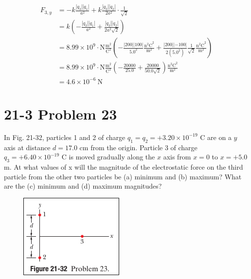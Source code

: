 \documentclass{article}
\begin{document}
\begin{align*}
    F_{3, y} &= -k \frac{|q_3||q_1|}{a^2} + k \frac{|q_3||q_2|}{2a^2} \cdot \frac{1}{\sqrt{2}} \\
    &= k \left( -\frac{|q_3||q_1|}{a^2} + \frac{|q_3||q_2|}{2a^2\sqrt{2}} \right) \\
    &= 8.99 \times 10^9 \cdot \text{N} \frac{\text{m}^2}{\text{C}^2} \left( -\frac{|200||100|}{5.0^2} \frac{\text{n$^2$C}^2}{\text{m}^2} + \frac{|200||-100|}{2(5.0^2)} \frac{1}{\sqrt{2}} \frac{\text{n$^2$C}^2}{\text{m}^2} \right) \\
    &= 8.99 \times 10^9 \cdot \text{N} \frac{\text{m}^2}{\text{C}^2} \left( -\frac{20000}{25.0} + \frac{20000}{50.0 \sqrt{2}}  \right) \frac{\text{n$^2$C}^2}{\text{m}^2}\\
    &= \boxed{4.6 \times 10^{-6} \ \text{N}}
\end{align*}

\section*{21-3 Problem 23}
In Fig. 21-32, particles 1 and 2 of charge $q_1 = q_2 = +3.20 \times 10^{-19}$ C are on a $y$ axis at distance $d = 17.0$ cm from the origin. 
Particle 3 of charge $q_3 = +6.40 \times 10^{-19}$ C is moved gradually along the $x$ axis from $x = 0$ to $x = +5.0$ m. 
At what values of x will the magnitude of the electrostatic force on the third particle from the other two particles be 
(a) minimum and 
(b) maximum? What are
the 
(c) minimum and 
(d) maximum magnitudes?

\begin{figure}[ht]
    \centering
    \includegraphics[scale=0.75]{image-5.png}
\end{figure}
\end{document}
